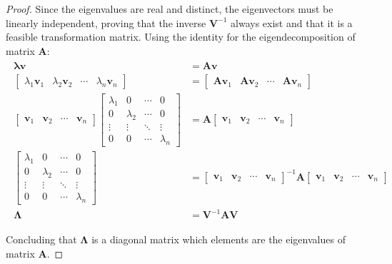\documentclass[a4paper,11pt]{book}
\numberwithin{figure}{chapter}
\numberwithin{equation}{chapter}
\numberwithin{table}{chapter}
\theoremstyle{definition}
\begin{document}
\begin{proof}
	Since the eigenvalues are real and distinct, the eigenvectors must be linearly independent, proving that the inverse $\bm{V}^{-1}$ always exist and that it is a feasible transformation matrix. Using the identity for the eigendecomposition of matrix $\bm{A}$:
	\begin{align}
	\begin{split}
		\bm{\lambda} \bm{v} &= \bm{A} \bm{v} \\
		\begin{bmatrix} \lambda_1 \bm{v}_1 & \lambda_2 \bm{v}_2 & \cdots & \lambda_n \bm{v}_n \end{bmatrix} &= \begin{bmatrix} \bm{A} \bm{v}_1 & \bm{A} \bm{v}_2 & \cdots & \bm{A} \bm{v}_n  \end{bmatrix} \\
		\begin{bmatrix} \bm{v}_1 & \bm{v}_2 & \cdots & \bm{v}_n \end{bmatrix} \begin{bmatrix} \lambda_1 & 0 & \cdots & 0 \\ 0 & \lambda_2 & \cdots & 0 \\ \vdots & \vdots & \ddots & \vdots \\ 0 & 0 & \cdots & \lambda_n  \end{bmatrix} & = \bm{A} \begin{bmatrix} \bm{v}_1 & \bm{v}_2 & \cdots & \bm{v}_n \end{bmatrix} \\
		\begin{bmatrix} \lambda_1 & 0 & \cdots & 0 \\ 0 & \lambda_2 & \cdots & 0 \\ \vdots & \vdots & \ddots & \vdots \\ 0 & 0 & \cdots & \lambda_n  \end{bmatrix} & = \begin{bmatrix} \bm{v}_1 & \bm{v}_2 & \cdots & \bm{v}_n \end{bmatrix}^{-1} \bm{A} \begin{bmatrix} \bm{v}_1 & \bm{v}_2 & \cdots & \bm{v}_n \end{bmatrix} \\
		\bm{\Lambda}  &= \bm{V}^{-1} \bm{A} \bm{V}
	\end{split}
	\end{align}
	
	Concluding that $\bm{\Lambda}$ is a diagonal matrix which elements are the eigenvalues of matrix $\bm{A}$.
\end{proof}
\end{document}
